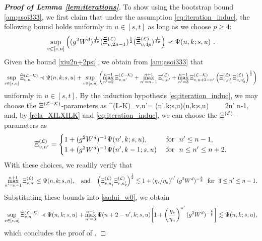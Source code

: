 \begin{proof}[\bf Proof of Lemma \ref{lem:iterations}]
To show  using the bootstrap bound \eqref{am;asoi333}, we first claim that under the assumption \eqref{eq:iteration_induc}, the following bound holds uniformly in $u\in[s,t]$ %
as long as we choose $p\ge 4$: 
 \begin{align} \label{xiu2n+2psi}
\sup_{v\in[s,u]}\left((\ilambda^2W^d)^{\frac{1}{4p}}(\wh\Xi^{(\cal L)}_{v, {2n-1}})^{\frac 1 2}(\wh\Xi^{(\cal L)}_{v, 4p})^{\frac{1}{4p}}\right)  \prec \Psi(n,k;s,u) \ .
\end{align} 
Given the bound \eqref{xiu2n+2psi}, we obtain from \eqref{am;asoi333} that
\begin{equation} 
\sup_{v\in[s,u]}\wh\Xi_{v,n }^{(\mathcal{L}-\mathcal{K})} \prec \Psi(n,k;s,u) + 
\sup_{v\in [s,u]}
\left( \max_{n'=2}^{n-1}\Xi^{({\cal L-\cal K})}_{v,n'}+\max_{n'=n-1}^{n+1}\Xi^{({\cal L})}_{v,n'}+\max_{n'=3}^{n-1} \Xi^{({\cal L-\cal K})}_{v,n+2-n'} \p{\Xi^{({\cal L})}_{v,n_1'} \Xi^{({\cal L})}_{v,n_2'}}^{\frac 12 } \right)\label{sadui_w0}
 \end{equation}
uniformly in $u\in[s,t]$. By the induction hypothesis \eqref{eq:iteration_induc}, we may choose the $\Xi^{({\cal L-\cal K})}$-parameters as 
\be \nonumber
\Xi^{({\cal L-\cal K})}_{v,n'}= \Psi(n',k;s,u)\le \Psi(n,k;s,u) \ \  \ \ 2\le n' \le n-1, %
\ee
and, by \eqref{rela_XILXILK} and \eqref{eq:iteration_induc}, we can choose the $\Xi^{({\cal L})}$-parameters as
\begin{align*}
   \Xi^{({\cal L})}_{v,n'}=\begin{cases}
       1+(\ilambda^2W^{d})^{-1} \Psi(n',k;s,u), \ & \text{for} \ \  n'\le n-1,\\  
   1+(\ilambda^2W^{d})^{-1} \Psi(n',k-1;s,u)\ & \text{for} \ \ n\le n'\le n+2. 
   \end{cases} 
\end{align*}
With these choices, we readily verify that  
\[\max_{n'=n-1}^{n+1}\Xi^{({\cal L})}_{v,n'} \le  \Psi(n,k;s,u),\quad \text{and}\quad  \p{\Xi^{({\cal L})}_{v,n_1'} \Xi^{({\cal L})}_{v,n_2'}}^{\frac 12 } \lesssim 1+\p{{\eta_s}/{\eta_u}}^{n'}(\ilambda^2W^d)^{-\frac{k}{8}} \ \ \text{for} \ \ 3\le n'\le {n-1}.\]
Substituting these bounds into \eqref{sadui_w0}, we obtain  %
 \begin{align*}
\sup_{v\in[s,u]}\wh\Xi_{v,n }^{(\mathcal{L}-\mathcal{K})}\prec \Psi(n,k;s,u) +  \max_{n'=3}^{n-1} \Psi(n+2-n',k;s,u)\bigg[1+\p{\frac{\eta_s}{\eta_u}}^{n'}(\ilambda^2W^d)^{-\frac{k}{8}}\bigg]\lesssim \Psi(n,k;s,u), 
 \end{align*}
which concludes the proof of .



\end{proof}
